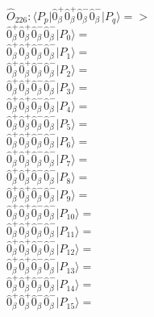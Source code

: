\documentclass[14pt]{article}
\begin{document}
    $\hat{O}_{226}:  \langle{P_p}\vert \hat{0}_{\beta}^{+}\hat{0}_{\beta}^{+}\hat{0}_{\beta}^{-}\hat{0}_{\beta}^{-} \vert{P_q}\rangle => $ \\ 
    $ \hat{0}_{\beta}^{+}\hat{0}_{\beta}^{+}\hat{0}_{\beta}^{-}\hat{0}_{\beta}^{-} \vert{P_{0}}\rangle =  $ \\ 
    $ \hat{0}_{\beta}^{+}\hat{0}_{\beta}^{+}\hat{0}_{\beta}^{-}\hat{0}_{\beta}^{-} \vert{P_{1}}\rangle =  $ \\ 
    $ \hat{0}_{\beta}^{+}\hat{0}_{\beta}^{+}\hat{0}_{\beta}^{-}\hat{0}_{\beta}^{-} \vert{P_{2}}\rangle =  $ \\ 
    $ \hat{0}_{\beta}^{+}\hat{0}_{\beta}^{+}\hat{0}_{\beta}^{-}\hat{0}_{\beta}^{-} \vert{P_{3}}\rangle =  $ \\ 
    $ \hat{0}_{\beta}^{+}\hat{0}_{\beta}^{+}\hat{0}_{\beta}^{-}\hat{0}_{\beta}^{-} \vert{P_{4}}\rangle =  $ \\ 
    $ \hat{0}_{\beta}^{+}\hat{0}_{\beta}^{+}\hat{0}_{\beta}^{-}\hat{0}_{\beta}^{-} \vert{P_{5}}\rangle =  $ \\ 
    $ \hat{0}_{\beta}^{+}\hat{0}_{\beta}^{+}\hat{0}_{\beta}^{-}\hat{0}_{\beta}^{-} \vert{P_{6}}\rangle =  $ \\ 
    $ \hat{0}_{\beta}^{+}\hat{0}_{\beta}^{+}\hat{0}_{\beta}^{-}\hat{0}_{\beta}^{-} \vert{P_{7}}\rangle =  $ \\ 
    $ \hat{0}_{\beta}^{+}\hat{0}_{\beta}^{+}\hat{0}_{\beta}^{-}\hat{0}_{\beta}^{-} \vert{P_{8}}\rangle =  $ \\ 
    $ \hat{0}_{\beta}^{+}\hat{0}_{\beta}^{+}\hat{0}_{\beta}^{-}\hat{0}_{\beta}^{-} \vert{P_{9}}\rangle =  $ \\ 
    $ \hat{0}_{\beta}^{+}\hat{0}_{\beta}^{+}\hat{0}_{\beta}^{-}\hat{0}_{\beta}^{-} \vert{P_{10}}\rangle =  $ \\ 
    $ \hat{0}_{\beta}^{+}\hat{0}_{\beta}^{+}\hat{0}_{\beta}^{-}\hat{0}_{\beta}^{-} \vert{P_{11}}\rangle =  $ \\ 
    $ \hat{0}_{\beta}^{+}\hat{0}_{\beta}^{+}\hat{0}_{\beta}^{-}\hat{0}_{\beta}^{-} \vert{P_{12}}\rangle =  $ \\ 
    $ \hat{0}_{\beta}^{+}\hat{0}_{\beta}^{+}\hat{0}_{\beta}^{-}\hat{0}_{\beta}^{-} \vert{P_{13}}\rangle =  $ \\ 
    $ \hat{0}_{\beta}^{+}\hat{0}_{\beta}^{+}\hat{0}_{\beta}^{-}\hat{0}_{\beta}^{-} \vert{P_{14}}\rangle =  $ \\ 
    $ \hat{0}_{\beta}^{+}\hat{0}_{\beta}^{+}\hat{0}_{\beta}^{-}\hat{0}_{\beta}^{-} \vert{P_{15}}\rangle =  $ \\ 
    
\end{document}
